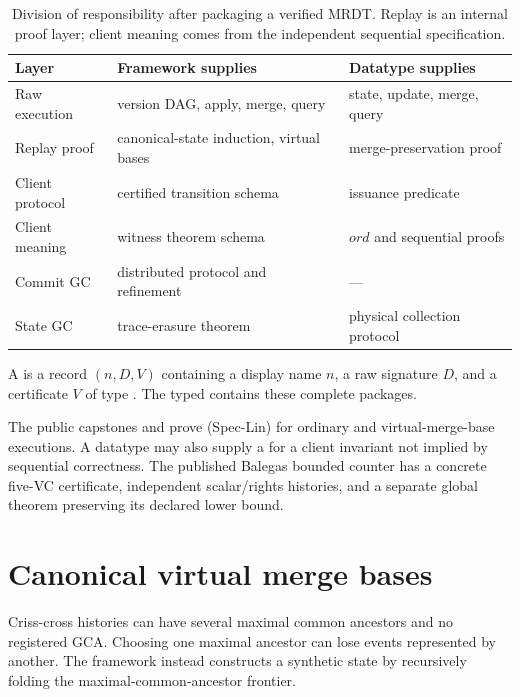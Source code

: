 \begin{table}[H]
\centering
\small
\begin{tabular}{@{}lll@{}}
\toprule
Layer & Framework supplies & Datatype supplies \\
\midrule
Raw execution & version DAG, apply, merge, query & state, update, merge, query \\
Replay proof & canonical-state induction, virtual bases & merge-preservation proof \\
Client protocol & certified transition schema & issuance predicate \\
Client meaning & witness theorem schema & $ord$ and sequential proofs \\
Commit GC & distributed protocol and refinement & --- \\
State GC & trace-erasure theorem & physical collection protocol \\
\bottomrule
\end{tabular}
\caption{Division of responsibility after packaging a verified MRDT. Replay is
an internal proof layer; client meaning comes from the independent sequential
specification.}
\label{tab:responsibilities}
\end{table}

\begin{definition}
A  is a record $(n,D,V)$ containing a display name $n$, a
raw signature $D$, and a certificate $V$ of type . The
typed  contains these complete packages.
\end{definition}

The public capstones  and
 prove (Spec-Lin) for ordinary and virtual-merge-base
executions. A datatype may also supply a  for a client
invariant not implied by sequential correctness. The published Balegas bounded
counter has a concrete five-VC certificate, independent scalar/rights histories,
and a separate global theorem preserving its declared lower bound.

\section{Canonical virtual merge bases}
\label{sec:virtual-base}

Criss-cross histories can have several maximal common ancestors and no
registered GCA. Choosing one maximal ancestor can lose events represented by
another. The framework instead constructs a synthetic state by recursively
folding the maximal-common-ancestor frontier.

